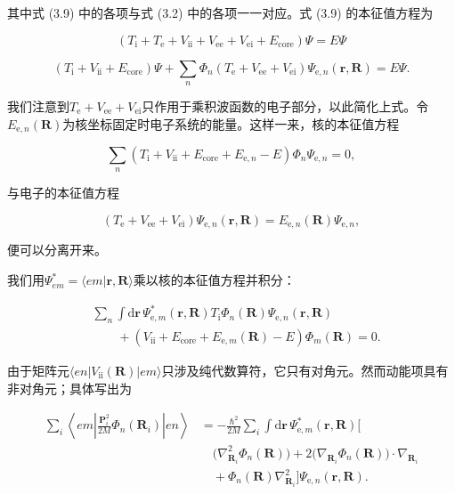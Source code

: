 其中式 (3.9) 中的各项与式 (3.2) 中的各项一一对应。式 (3.9) 的本征值方程为

\begin{equation*}
(T_{\mathrm i} + T_{\mathrm e} + V_{\mathrm{ii}} + V_{\mathrm{ee}} + V_{\mathrm{ei}} + E_{\mathrm{core}})\Psi = E\Psi
\tag{3.10}
\end{equation*}

\begin{equation*}
(T_{\mathrm i} + V_{\mathrm{ii}} + E_{\mathrm{core}})\Psi + \sum_n \Phi_n(T_{\mathrm e} + V_{\mathrm{ee}} + V_{\mathrm{ei}})\Psi_{\mathrm e,n}(\mathbf r,\mathbf R) = E\Psi.
\tag{3.11}
\end{equation*}

我们注意到$T_{\mathrm e}+V_{\mathrm{ee}}+V_{\mathrm{ei}}$只作用于乘积波函数的电子部分，以此简化上式。令$E_{\mathrm e,n}(\mathbf R)$为核坐标固定时电子系统的能量。这样一来，核的本征值方程

\begin{equation*}
\sum_n \left(T_{\mathrm i} + V_{\mathrm{ii}} + E_{\mathrm{core}} + E_{\mathrm e,n} - E\right)\Phi_n\Psi_{\mathrm e,n} = 0,
\tag{3.12}
\end{equation*}

与电子的本征值方程

\begin{equation*}
(T_{\mathrm e} + V_{\mathrm{ee}} + V_{\mathrm{ei}})\Psi_{\mathrm e,n}(\mathbf r,\mathbf R) = E_{\mathrm e,n}(\mathbf R)\Psi_{\mathrm e,n},
\tag{3.13}
\end{equation*}

便可以分离开来。

我们用$\Psi_{em}^{*}=\langle em|\mathbf r,\mathbf R\rangle$乘以核的本征值方程并积分：

\begin{align*}
&\sum_n \int \mathrm d\mathbf r\, \Psi_{\mathrm e,m}^{*}(\mathbf r,\mathbf R)T_{\mathrm i}\Phi_n(\mathbf R)\Psi_{\mathrm e,n}(\mathbf r,\mathbf R) \\
&\qquad + \left(V_{\mathrm{ii}} + E_{\mathrm{core}} + E_{\mathrm e,m}(\mathbf R) - E\right)\Phi_m(\mathbf R) = 0.
\tag{3.14}
\end{align*}

由于矩阵元$\langle en|V_{\mathrm{ii}}(\mathbf R)|em\rangle$只涉及纯代数算符，它只有对角元。然而动能项具有非对角元；具体写出为

\begin{align*}
\sum_i \left\langle em\left|\frac{\mathbf P_i^2}{2M}\Phi_n(\mathbf R_i)\right|en\right\rangle &= -\frac{\hbar^2}{2M}\sum_i \int \mathrm d\mathbf r\, \Psi_{\mathrm e,m}^{*}(\mathbf r,\mathbf R)\Big[ \\
&\quad \big(\nabla_{\mathbf R_i}^2\Phi_n(\mathbf R)\big) + 2\big(\nabla_{\mathbf R_i}\Phi_n(\mathbf R)\big)\cdot\nabla_{\mathbf R_i} \\
&\quad + \Phi_n(\mathbf R)\nabla_{\mathbf R_i}^2\Big]\Psi_{\mathrm e,n}(\mathbf r,\mathbf R).
\tag{3.15}
\end{align*}


